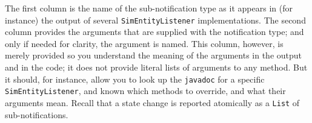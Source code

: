 The first column is the name of the sub-notification type
  as it appears in (for instance) the output of
  several \lstinline|SimEntityListener|
  implementations.
The second column provides the arguments
  that are supplied with the notification type;
  and only if needed for clarity, the argument is named.
This column, however,
  is merely provided so you understand the meaning of the
  arguments in the output
  and in the code;
  it does not provide literal lists of arguments to any method.
But it should, for instance, allow you
  to look up the \lstinline|javadoc|
  for a specific \lstinline|SimEntityListener|,
  and known which methods to override,
  and what their arguments mean.
Recall that a state change is reported
  atomically
  as a \lstinline|List| of sub-notifications.